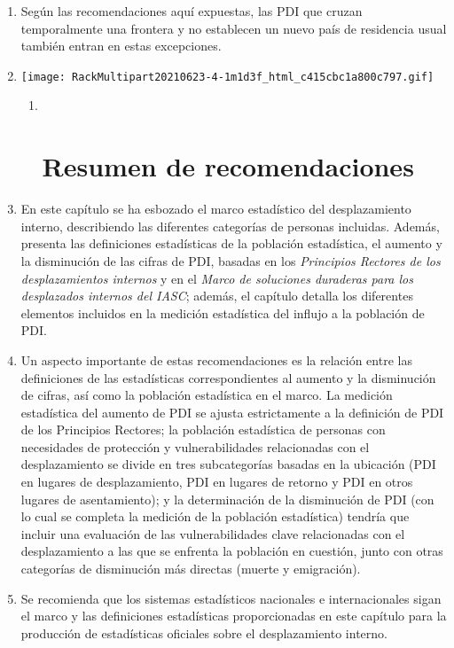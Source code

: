 \documentclass[
]{book}
\begin{document}
\begin{enumerate}
\def\labelenumi{\arabic{enumi}.}
\item
  Según las recomendaciones aquí expuestas, las PDI que cruzan temporalmente una frontera y no establecen un nuevo país de residencia usual también entran en estas excepciones.
\item
  \texttt{[image: RackMultipart20210623-4-1m1d3f\_html\_c415cbc1a800c797.gif]}

  \begin{enumerate}
  \def\labelenumii{\arabic{enumii}.}
  \item ~
    \hypertarget{resumen-de-recomendaciones}{%
    \section{Resumen de recomendaciones}\label{resumen-de-recomendaciones}}
  \end{enumerate}
\item
  En este capítulo se ha esbozado el marco estadístico del desplazamiento interno, describiendo las diferentes categorías de personas incluidas. Además, presenta las definiciones estadísticas de la población estadística, el aumento y la disminución de las cifras de PDI, basadas en los \emph{Principios Rectores de los desplazamientos internos} y en el \emph{Marco de soluciones duraderas para los desplazados internos del IASC}; además, el capítulo detalla los diferentes elementos incluidos en la medición estadística del influjo a la población de PDI.
\item
  Un aspecto importante de estas recomendaciones es la relación entre las definiciones de las estadísticas correspondientes al aumento y la disminución de cifras, así como la población estadística en el marco. La medición estadística del aumento de PDI se ajusta estrictamente a la definición de PDI de los Principios Rectores; la población estadística de personas con necesidades de protección y vulnerabilidades relacionadas con el desplazamiento se divide en tres subcategorías basadas en la ubicación (PDI en lugares de desplazamiento, PDI en lugares de retorno y PDI en otros lugares de asentamiento); y la determinación de la disminución de PDI (con lo cual se completa la medición de la población estadística) tendría que incluir una evaluación de las vulnerabilidades clave relacionadas con el desplazamiento a las que se enfrenta la población en cuestión, junto con otras categorías de disminución más directas (muerte y emigración).
\item
  Se recomienda que los sistemas estadísticos nacionales e internacionales sigan el marco y las definiciones estadísticas proporcionadas en este capítulo para la producción de estadísticas oficiales sobre el desplazamiento interno.
\end{enumerate}
\end{document}
